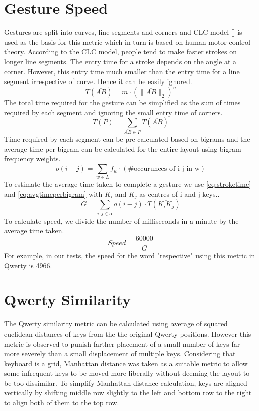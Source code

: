 \documentclass[MTech]{iitmdiss}
\begin{document}
\section{Gesture Speed}
Gestures are split into curves, line segments and corners and CLC model [\cite{strokes}] is used as the basis for this metric which in turn is based on human motor control theory. According to the CLC model, people tend to make faster strokes on longer line segments. The entry time for a stroke depends on the angle at a corner. However, this entry time much smaller than the entry time for a line segment irrespective of curve. Hence it can be easily ignored. 
\begin{equation} \label{eq:stroketime}
T( \overline{AB} )= m \cdot (\| \overline{AB} \|_{2})^n
\end{equation}
The total time required for the gesture can be simplified as the sum of times required by each segment and ignoring the small entry time of corners. 
\begin{equation} T(P)= \sum_{\overline{AB} \in P} T(\overline{AB}) \end{equation}
Time required by each segment can be pre-calculated based on bigrams and the average time per bigram can be calculated for the entire layout using bigram frequency weights.
\begin{equation} \label{eq:avgtimeperbigram} o(i-j)= \sum_{w \in L} f_{w} \cdot (\text {\# occurunces of i-j in w}) \end{equation}
To estimate the average time taken to complete a gesture we use \ref{eq:stroketime} and \ref{eq:avgtimeperbigram} with $K_{i}$ and $K_{j}$ as centres of i and j keys..
\begin{equation} G = \sum_{i,j \in \alpha} o(i-j) \cdot T(\overline{K_{i}K_{j}}) \end{equation}
To calculate speed, we divide the number of milliseconds in a minute by the average time taken.
\begin{equation}
Speed = \frac{60000}{G}
\end{equation}
For example, in our tests, the speed for the word "respective" using this metric in Qwerty is 4966.

\section{Qwerty Similarity}
The Qwerty similarity metric can be calculated using average of squared euclidean distances of keys from the the original Qwerty positions. However this metric is observed to punish farther placement of a small number of keys far more severely than a small displacement of multiple keys. Considering that keyboard is a grid, Manhattan distance was taken as a suitable metric to allow some infrequent keys to be moved more liberally without deeming the layout to be too dissimilar. To simplify Manhattan distance calculation, keys are aligned vertically by shifting middle row slightly to the left and bottom row to the right to align both of them to the top row.
\end{document}
